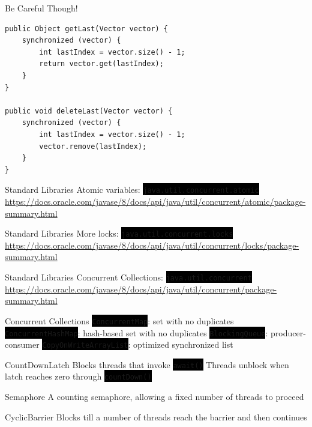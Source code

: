 \documentclass[
14pt,
aspectratio=169,
usenames,
dvipsnames,
x11names]{beamer}
\newcommand{\code}[1]{{\colorbox{black}{\color{green}\texttt{#1}}}}
\begin{document}
\begin{frame}[fragile]{Be Careful Though!}
\begin{lstlisting}
public Object getLast(Vector vector) {
    synchronized (vector) {
        int lastIndex = vector.size() - 1;
        return vector.get(lastIndex);
    }
}

public void deleteLast(Vector vector) {
    synchronized (vector) {
        int lastIndex = vector.size() - 1;
        vector.remove(lastIndex);
    }
}
\end{lstlisting}
\end{frame}

\begin{frame}{Standard Libraries}
  Atomic variables: \code{java.util.concurrent.atomic}
  \vfill
  \url{https://docs.oracle.com/javase/8/docs/api/java/util/concurrent/atomic/package-summary.html}
\end{frame}

\begin{frame}{Standard Libraries}
  More locks: \code{java.util.concurrent.locks}
  \vfill
  \url{https://docs.oracle.com/javase/8/docs/api/java/util/concurrent/locks/package-summary.html}
\end{frame}

\begin{frame}{Standard Libraries}
  Concurrent Collections: \code{java.util.concurrent}
  \vfill
  \url{https://docs.oracle.com/javase/8/docs/api/java/util/concurrent/package-summary.html}
\end{frame}

\begin{frame}{Concurrent Collections}
  \code{ConcurrentMap}: set with no duplicates
  \vfill
  \code{ConcurrentHashMap}: hash-based set with no duplicates
  \vfill
  \code{BlockingQueue}: producer-consumer
  \vfill
  \code{CopyOnWriteArrayList}: optimized synchronized list
\end{frame}

\begin{frame}{CountDownLatch}
  Blocks threads that invoke \code{await()}
  \vfill
  Threads unblock when latch reaches zero through \code{countDown()}
\end{frame}

\begin{frame}{Semaphore}
  A counting semaphore, allowing a fixed number of threads to proceed
\end{frame}

\begin{frame}{CyclicBarrier}
  Blocks till a number of threads reach the barrier and then continues
\end{frame}
\end{document}
